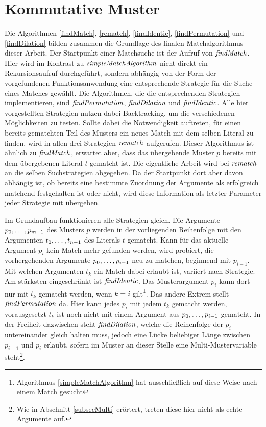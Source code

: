 \section{Kommutative Muster} \label{subsecACMuster}

Die Algorithmen \ref{findMatch}, \ref{rematch}, \ref{findIdentic}, \ref{findPermutation} und \ref{findDilation} bilden zusammen die Grundlage des finalen Matchalgorithmus dieser Arbeit. Der Startpunkt einer Matchsuche ist der Aufruf von $\mathit{findMatch}$. Hier wird im Kontrast zu $\mathit{simpleMatchAlgorithm}$ nicht direkt ein Rekursionsaufruf durchgeführt, sondern abhängig von der Form der vorgefundenen Funktionsanwendung eine entsprechende Strategie für die Suche eines Matches gewählt. Die Algorithmen, die die entsprechenden Strategien implementieren, sind $\mathit{findPermutation}$, $\mathit{findDilation}$ und $\mathit{findIdentic}$. Alle hier vorgestellten Strategien nutzen dabei Backtracking, um die verschiedenen Möglichkeiten zu testen. Sollte dabei die Notwendigkeit auftreten, für einen bereits gematchten Teil des Musters ein neues Match mit dem selben Literal zu finden, wird in allen drei Strategien $\mathit{rematch}$ aufgerufen. Dieser Algorithmus ist ähnlich zu $\mathit{findMatch}$, erwartet aber, dass das übergebende Muster $p$ bereits mit dem übergebenen Literal $t$ gematcht ist. Die eigentliche Arbeit wird bei $\mathit{rematch}$ an die selben Suchstrategien abgegeben. Da der Startpunkt dort aber davon abhängig ist, ob bereits eine bestimmte Zuordnung der Argumente als erfolgreich matchend festgehalten ist oder nicht, wird diese Information als letzter Parameter jeder Strategie mit übergeben.


Im Grundaufbau funktionieren alle Strategien gleich. Die Argumente ${p}_{0}, \dots, {p}_{m-1}$ des Musters $p$ werden in der vorliegenden Reihenfolge mit den Argumenten ${t}_{0}, \dots, {t}_{n-1}$ des Literals $t$ gematcht. Kann für das aktuelle Argument $p_i$ kein Match mehr gefunden werden, wird probiert, die vorhergehenden Argumente ${p}_{0}, \dots, {p}_{i-1}$ neu zu matchen, beginnend mit $p_{i-1}$. Mit welchen Argumenten $t_k$ ein Match dabei erlaubt ist, variiert nach Strategie. Am stärksten eingeschränkt ist $\mathit{findIdentic}$. Das Musterargument $p_i$ kann dort nur mit $t_k$ gematcht werden, wenn $k = i$ gilt\footnote{Algorithmus \ref{simpleMatchAlgorithm} hat ausschließlich auf diese Weise nach einem Match gesucht}. Das andere Extrem stellt $\mathit{findPermutation}$ da. Hier kann jedes $p_i$ mit jedem $t_k$ gematcht werden, vorausgesetzt $t_k$ ist noch nicht mit einem Argument aus ${p}_{0}, \dots, {p}_{i-1}$ gematcht. In der Freiheit dazwischen steht $\mathit{findDilation}$, welche die Reihenfolge der $p_i$ untereinander gleich halten muss, jedoch eine Lücke beliebiger Länge zwischen $p_{i-1}$ und $p_i$ erlaubt, sofern im Muster an dieser Stelle eine Multi-Mustervariable steht\footnote{Wie in Abschnitt \ref{subsecMulti} erörtert, treten diese hier nicht als echte Argumente auf.}.

